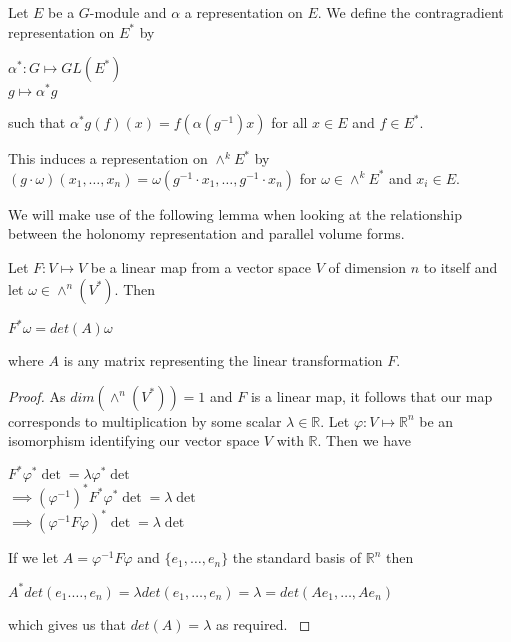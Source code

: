 \begin{definition}
    Let $E$ be a $G$-module and $\alpha$ a representation on $E$. We define
    the contragradient representation on $E^*$ by
    \begin{center}
        $\alpha^*: G \mapsto GL(E^*)$\\
        $g \mapsto \alpha^* g$
    \end{center}
    such that $\alpha^*g(f)(x) = f(\alpha(g^{-1})x)$ for all $x \in E$ and $f\in E^*$.
\end{definition}

\begin{remark}
    This induces a representation on $\wedge^kE^*$ by \\$(g\cdot \omega)(x_1, \dots , x_n) = \omega(g^{-1}\cdot x_1, \dots, g^{-1}\cdot x_n)$ for $\omega \in \wedge^k E^*$
        and $x_i \in E$.
\end{remark}

We will make use of the following lemma when looking at the relationship
between the holonomy representation and parallel volume forms.

\begin{lemma}
    Let $F: V \mapsto V$ be a linear map from a vector space $V$ of dimension $n$ to itself
    and let $\omega \in \wedge^n(V^*)$. Then
    \begin{center}
        $F^*\omega = det(A)\omega$
    \end{center}
    where $A$ is any matrix representing the linear transformation $F$.
\end{lemma}
\begin{proof}
    As $dim(\wedge^n(V^*)) = 1$ and $F$ is a linear map, it follows that our map corresponds to multiplication
    by some scalar $\lambda \in \mathbb{R}$. Let $\varphi: V \mapsto \mathbb{R}^n$ be an isomorphism identifying
    our vector space $V$ with $\mathbb{R}$. Then we have
    \begin{center}
        $F^*\varphi^*\det = \lambda\varphi^* \det$\\
        $\implies (\varphi^{-1})^* F^*\varphi^*\det = \lambda \det$\\
        $\implies (\varphi^{-1} F \varphi)^*\det = \lambda \det$
    \end{center}
    If we let $A = \varphi^{-1} F \varphi$ and $\{e_1, \dots , e_n\}$ the standard basis of $\mathbb{R}^n$
    then
    \begin{center}
        $A^*det(e_1. \dots , e_n) = \lambda det(e_1, \dots , e_n) = \lambda = det(Ae_1, \dots, Ae_n)$
    \end{center}
    which gives us that $det(A)= \lambda$ as required. \label{lemma:volume}
\end{proof}

